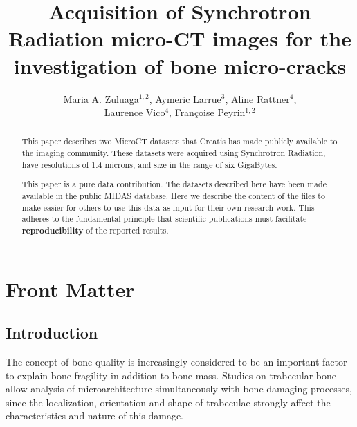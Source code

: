 \documentclass{InsightArticle}
\title{Acquisition of Synchrotron Radiation micro-CT images for the investigation of bone
micro-cracks}
\author{Maria A. Zuluaga$^{1,2}$, Aymeric Larrue$^{3}$, Aline Rattner$^{4}$, \\Laurence Vico$^{4}$, Fran\c{c}oise Peyrin$^{1,2}$}
\newcommand{\IJhandlerIDnumber}{3261}
\begin{document}
%
%
\IJhandlefooter{\IJhandlerIDnumber}


\ifpdf
\else
\fi


\maketitle


\ifhtml
\chapter*{Front Matter\label{front}}
\fi


\begin{abstract}
\noindent
This paper describes two MicroCT datasets that Creatis has made publicly
available to the imaging community. These datasets were acquired using
Synchrotron Radiation, have resolutions of 1.4 microns, and size in the range of
six GigaBytes.

This paper is a pure data contribution. The datasets described here have been
made available in the public MIDAS database. Here we describe the content of
the files to make easier for others to use this data as input for their own
research work.  This adheres to the fundamental principle that scientific
publications must facilitate \textbf{reproducibility} of the reported results.
\end{abstract}

\tableofcontents

\section{Introduction}

The concept of bone quality is increasingly considered to be an important factor
to explain bone fragility in addition to bone mass. Studies on trabecular 
bone allow analysis of microarchitecture simultaneously with bone-damaging
processes, since the localization, orientation and shape of trabeculae strongly
affect the characteristics and nature of this damage.
\end{document}
